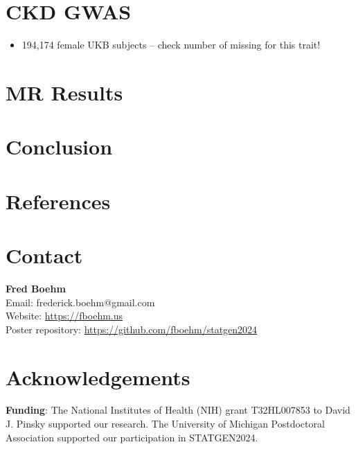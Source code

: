 {\section{CKD GWAS \cite{neale_lab_gwas}}
\begin{itemize}
\item 194,174 female UKB subjects -- check number of missing for this trait!
\end{itemize}


\section{MR Results}




\section{Conclusion}





\section{References}
\printbibliography[heading=none]


\section{Contact}
\textbf{Fred Boehm}\\
Email: frederick.boehm@gmail.com\\
Website: \url{https://fboehm.us}\\
Poster repository: \url{https://github.com/fboehm/statgen2024}


\section{Acknowledgements}
\textbf{Funding}: The National Institutes of Health (NIH) grant T32HL007853 to David J. Pinsky supported our research. The University of Michigan Postdoctoral Association supported our participation in STATGEN2024. 

}

